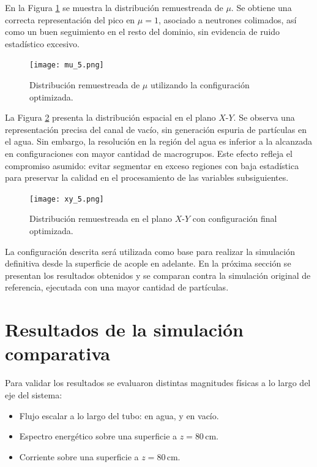 En la Figura \ref{fig:mu_5} se muestra la distribución remuestreada de $\mu$. Se obtiene una correcta representación del pico en $\mu = 1$, asociado a neutrones colimados, así como un buen seguimiento en el resto del dominio, sin evidencia de ruido estadístico excesivo.

\begin{figure}[H]
    \centering
    \texttt{[image: mu\_5.png]}
    \caption{Distribución remuestreada de $\mu$ utilizando la configuración optimizada.}
    \label{fig:mu_5}
\end{figure}

La Figura \ref{fig:xy_5} presenta la distribución espacial en el plano $X$-$Y$. Se observa una representación precisa del canal de vacío, sin generación espuria de partículas en el agua. Sin embargo, la resolución en la región del agua es inferior a la alcanzada en configuraciones con mayor cantidad de macrogrupos. Este efecto refleja el compromiso asumido: evitar segmentar en exceso regiones con baja estadística para preservar la calidad en el procesamiento de las variables subsiguientes.

\begin{figure}[H]
    \centering
    \texttt{[image: xy\_5.png]}
    \caption{Distribución remuestreada en el plano $X$-$Y$ con configuración final optimizada.}
    \label{fig:xy_5}
\end{figure}


La configuración descrita será utilizada como base para realizar la simulación definitiva desde la superficie de acople en adelante. En la próxima sección se presentan los resultados obtenidos y se comparan contra la simulación original de referencia, ejecutada con una mayor cantidad de partículas.

\section{Resultados de la simulación comparativa}

Para validar los resultados se evaluaron distintas magnitudes físicas a lo largo del eje del sistema:

\begin{itemize}
    \item Flujo escalar a lo largo del tubo: en agua, y en vacío.
    \item Espectro energético sobre una superficie a $z = 80\,\text{cm}$.
    \item Corriente sobre una superficie a $z = 80\,\text{cm}$.
\end{itemize}

